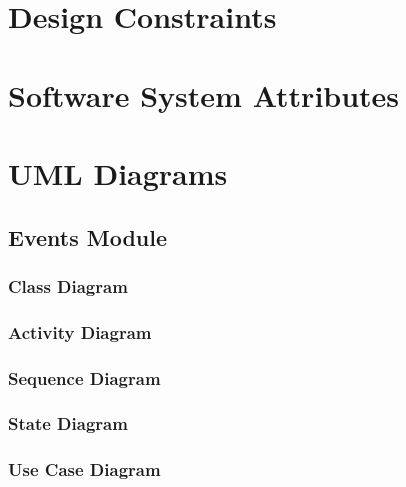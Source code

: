 \documentclass{article}
\begin{document}
		
		
	\clearpage

	\section{Design Constraints}\label{sec:design-constraints}
	
		

	\clearpage
	
	\section{Software System Attributes}\label{sec:design-constraints}
	
			

	\clearpage
	
	\section{UML Diagrams}\label{sec:uml-diagrams}
	
		
		\subsection{Events Module}\label{subsec:uml-diagrams-events}
		
		
			\subsubsection{Class Diagram}\label{subsec:uml-diagrams-events-class}
			
			
			\subsubsection{Activity Diagram}\label{subsec:uml-diagrams-events-act}
			
			
			\subsubsection{Sequence Diagram}\label{subsec:uml-diagrams-events-seq}
						
			
			\subsubsection{State Diagram}\label{subsec:uml-diagrams-events-state}
			
			
			\subsubsection{Use Case Diagram}\label{subsec:uml-diagrams-events-uc}
						
\end{document}
